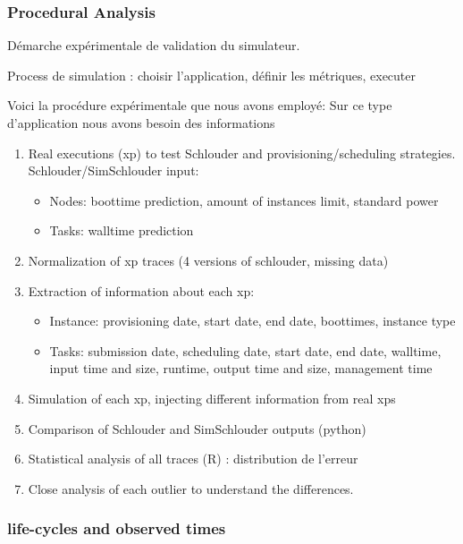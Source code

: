 {\subsubsection{Procedural Analysis}

Démarche expérimentale de validation du simulateur.

Process de simulation : choisir l'application, définir les métriques, executer 

Voici la procédure expérimentale que nous avons employé:
Sur ce type d'application nous avons besoin des informations 

\begin{enumerate}
 \item Real executions (xp) to test Schlouder and provisioning/scheduling 
strategies.
  Schlouder/SimSchlouder input:
  \begin{itemize}
   \item Nodes: boottime prediction, amount of instances limit, standard power
   \item Tasks: walltime prediction
  \end{itemize}
 
 \item Normalization of xp traces (4 versions of schlouder, missing data)
 \item Extraction of information about each xp:
  \begin{itemize}
   \item Instance: provisioning date, start date, end date, boottimes, instance 
type
   \item Tasks: submission date, scheduling date, start date, end date, 
	  walltime, input time and size, runtime, output time and size, 
management time
  \end{itemize}
 \item Simulation of each xp, injecting different information from real xps
 \item Comparison of Schlouder and SimSchlouder outputs (python)
 \item Statistical analysis of all traces (R) : distribution de l'erreur
            
 \item Close analysis of each outlier to understand the differences. 
\end{enumerate}





\subsubsection{life-cycles and observed times}

}
